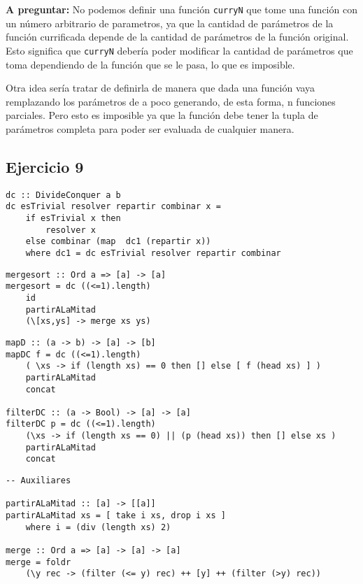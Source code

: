 \textbf{A preguntar:} No podemos definir una función \texttt{curryN} que tome una función con un número arbitrario de parametros, ya que la cantidad de parámetros de la función currificada depende de la cantidad de parámetros de la función original. Esto significa que \texttt{curryN} debería poder modificar la cantidad de parámetros que toma dependiendo de la función que se le pasa, lo que es imposible.

Otra idea sería tratar de definirla de manera que dada una función vaya remplazando los parámetros de a poco generando, de esta forma, n funciones parciales. Pero esto es imposible ya que la función debe tener la tupla de parámetros completa para poder ser evaluada de cualquier manera.

\subsection{Ejercicio 9}
\begin{centrado}
	\begin{verbatim}
dc :: DivideConquer a b
dc esTrivial resolver repartir combinar x = 
	if esTrivial x then 
		resolver x 
	else combinar (map  dc1 (repartir x))
	where dc1 = dc esTrivial resolver repartir combinar

\end{verbatim}
\end{centrado}

\begin{centrado}
	\begin{verbatim}
mergesort :: Ord a => [a] -> [a]
mergesort = dc ((<=1).length)
	id
	partirALaMitad
	(\[xs,ys] -> merge xs ys)	
	\end{verbatim}
\end{centrado}

\begin{centrado}
	\begin{verbatim}
mapD :: (a -> b) -> [a] -> [b]
mapDC f = dc ((<=1).length)
	( \xs -> if (length xs) == 0 then [] else [ f (head xs) ] )
	partirALaMitad
	concat

filterDC :: (a -> Bool) -> [a] -> [a]
filterDC p = dc ((<=1).length)
	(\xs -> if (length xs == 0) || (p (head xs)) then [] else xs )
	partirALaMitad
	concat
	\end{verbatim}
\end{centrado}

\begin{centrado}
	\begin{verbatim}
-- Auxiliares

partirALaMitad :: [a] -> [[a]]
partirALaMitad xs = [ take i xs, drop i xs ] 
	where i = (div (length xs) 2)

merge :: Ord a => [a] -> [a] -> [a]
merge = foldr 
	(\y rec -> (filter (<= y) rec) ++ [y] ++ (filter (>y) rec))	 
	\end{verbatim}
\end{centrado}

